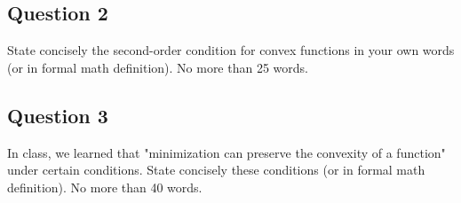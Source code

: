 \documentclass{article}
\begin{document}
\subsection{Question 2}
State concisely the second-order condition for convex functions in your own words (or in formal math definition). No more than 25 words.
\subsection{Question 3}
In class, we learned that "minimization can preserve the convexity of a function" under
certain conditions. State concisely these conditions (or in formal math definition). No more than 40 words.
\end{document}
